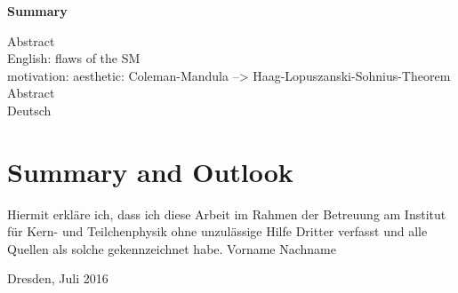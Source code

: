 \begin{center}\large\bfseries Summary\end{center}
Abstract \\ 
English: flaws of the SM\\
motivation: aesthetic: Coleman-Mandula --> Haag-Lopuszanski-Sohnius-Theorem\\
\vspace{20em}
Abstract \\ 
Deutsch \\
\newpage
 
\tableofcontents
\newpage





\newpage

\newpage

\newpage

\newpage

\newpage

\newpage

\newpage

\newpage
\section{Summary and Outlook}
\newpage

\newpage

\newpage
\clearpage
\thispagestyle{empty}
\vspace*{1.5em}
Hiermit erkläre ich, dass ich diese Arbeit im Rahmen der Betreuung am Institut
für Kern- und Teilchenphysik ohne unzulässige Hilfe Dritter verfasst und alle Quellen als solche gekennzeichnet habe.
\vspace*{45em}
Vorname Nachname \par
Dresden, Juli 2016


